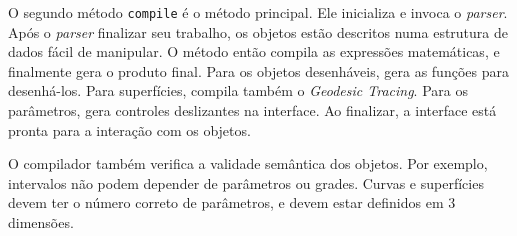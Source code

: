 O segundo método \texttt{compile} é o método principal.
Ele inicializa e invoca o \textit{parser}.
Após o \textit{parser} finalizar seu trabalho, os objetos estão descritos
numa estrutura de dados fácil de manipular.
O método então compila as expressões matemáticas, e finalmente gera o produto final.
Para os objetos desenháveis, gera as funções para desenhá-los.
Para superfícies, compila também o \textit{Geodesic Tracing}.
Para os parâmetros, gera controles deslizantes na interface.
Ao finalizar, a interface está pronta para a interação com os objetos.

O compilador também verifica a validade semântica dos objetos.
Por exemplo, intervalos não podem depender de parâmetros ou grades.
Curvas e superfícies devem ter o número correto de parâmetros, e devem estar
definidos em 3 dimensões.